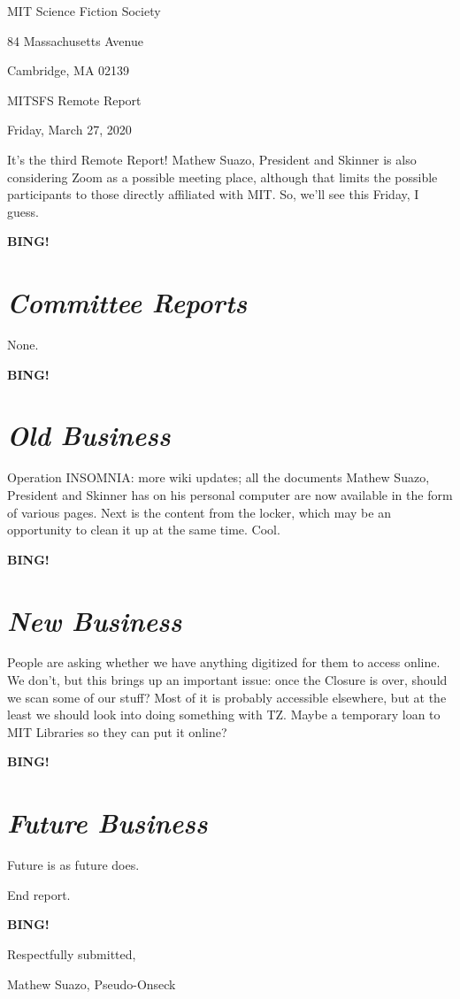\documentclass[10pt]{article}
\newcommand{\bing}{{\bf BING!} }
\newcommand{\goto}[1]{\bing \vskip 12pt \section*{{\em{#1}}}}
\newcommand{\skinner}{Mathew Suazo, President and Skinner\xspace}
\newcommand{\onseck}{Mathew Suazo, Pseudo-Onseck\xspace}
\newcommand{\meetingdate}{Friday, March 27, 2020}
\begin{document}
\begin{center}

MIT Science Fiction Society

84 Massachusetts Avenue

Cambridge, MA 02139

\vspace{12pt}

MITSFS Remote Report

\meetingdate

\end{center}

\vspace{18pt}

\setlength{\parskip}{6pt}

\noindent
It's the third Remote Report! \skinner is also considering Zoom as a possible meeting place, although that limits the possible participants to those directly affiliated with MIT. So, we'll see this Friday, I guess.

\goto{Committee Reports}

None.

\goto{Old Business}

Operation INSOMNIA: more wiki updates; all the documents \skinner has on his personal computer are now available in the form of various pages. Next is the content from the locker, which may be an opportunity to clean it up at the same time. Cool.

\goto{New Business}

People are asking whether we have anything digitized for them to access online. We don't, but this brings up an important issue: once the Closure is over, should we scan some of our stuff? Most of it is probably accessible elsewhere, but at the least we should look into doing something with TZ. Maybe a temporary loan to MIT Libraries so they can put it online?

\goto{Future Business}

Future is as future does.

\noindent
End report.

\bing
\vspace{18pt}

\centerline{Respectfully submitted,}
\centerline{\onseck}
\end{document}
